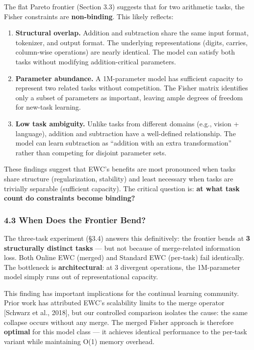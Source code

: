 \documentclass[
]{article}
\begin{document}
The flat Pareto frontier (Section 3.3) suggests that for two arithmetic
tasks, the Fisher constraints are \textbf{non-binding}. This likely
reflects:

\begin{enumerate}
\def\labelenumi{\arabic{enumi}.}
\item
  \textbf{Structural overlap.} Addition and subtraction share the same
  input format, tokenizer, and output format. The underlying
  representations (digits, carries, column-wise operations) are nearly
  identical. The model can satisfy both tasks without modifying
  addition-critical parameters.
\item
  \textbf{Parameter abundance.} A 1M-parameter model has sufficient
  capacity to represent two related tasks without competition. The
  Fisher matrix identifies only a subset of parameters as important,
  leaving ample degrees of freedom for new-task learning.
\item
  \textbf{Low task ambiguity.} Unlike tasks from different domains
  (e.g., vision + language), addition and subtraction have a
  well-defined relationship. The model can learn subtraction as
  ``addition with an extra transformation'' rather than competing for
  disjoint parameter sets.
\end{enumerate}

These findings suggest that EWC's benefits are most pronounced when
tasks share structure (regularization, stability) and least necessary
when tasks are trivially separable (sufficient capacity). The critical
question is: \textbf{at what task count do constraints become binding?}

\subsubsection{4.3 When Does the Frontier
Bend?}\label{when-does-the-frontier-bend}

The three-task experiment (§3.4) answers this definitively: the frontier
bends at \textbf{3 structurally distinct tasks} --- but not because of
merge-related information loss. Both Online EWC (merged) and Standard
EWC (per-task) fail identically. The bottleneck is
\textbf{architectural}: at 3 divergent operations, the 1M-parameter
model simply runs out of representational capacity.

This finding has important implications for the continual learning
community. Prior work has attributed EWC's scalability limits to the
merge operator {[}Schwarz et al., 2018{]}, but our controlled comparison
isolates the cause: the same collapse occurs without any merge. The
merged Fisher approach is therefore \textbf{optimal} for this model
class --- it achieves identical performance to the per-task variant
while maintaining O(1) memory overhead.
\end{document}
